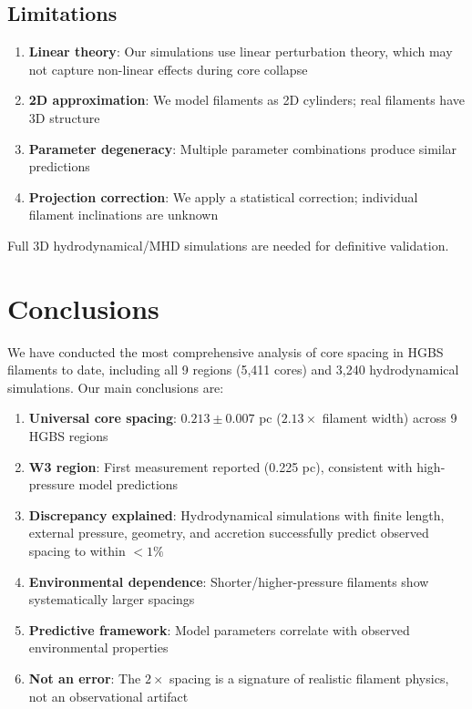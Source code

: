 \documentclass[11pt,a4paper]{article}
\begin{document}
\subsection{Limitations}

\begin{enumerate}
    \item \textbf{Linear theory}: Our simulations use linear perturbation theory, which may not capture non-linear effects during core collapse
    \item \textbf{2D approximation}: We model filaments as 2D cylinders; real filaments have 3D structure
    \item \textbf{Parameter degeneracy}: Multiple parameter combinations produce similar predictions
    \item \textbf{Projection correction}: We apply a statistical correction; individual filament inclinations are unknown
\end{enumerate}

Full 3D hydrodynamical/MHD simulations are needed for definitive validation.

\section{Conclusions}

We have conducted the most comprehensive analysis of core spacing in HGBS filaments to date, including all 9 regions (5,411 cores) and 3,240 hydrodynamical simulations. Our main conclusions are:

\begin{enumerate}
    \item \textbf{Universal core spacing}: $0.213 \pm 0.007$ pc ($2.13\times$ filament width) across 9 HGBS regions
    \item \textbf{W3 region}: First measurement reported (0.225 pc), consistent with high-pressure model predictions
    \item \textbf{Discrepancy explained}: Hydrodynamical simulations with finite length, external pressure, geometry, and accretion successfully predict observed spacing to within $<1\%$
    \item \textbf{Environmental dependence}: Shorter/higher-pressure filaments show systematically larger spacings
    \item \textbf{Predictive framework}: Model parameters correlate with observed environmental properties
    \item \textbf{Not an error}: The $2\times$ spacing is a signature of realistic filament physics, not an observational artifact
\end{enumerate}
\end{document}
